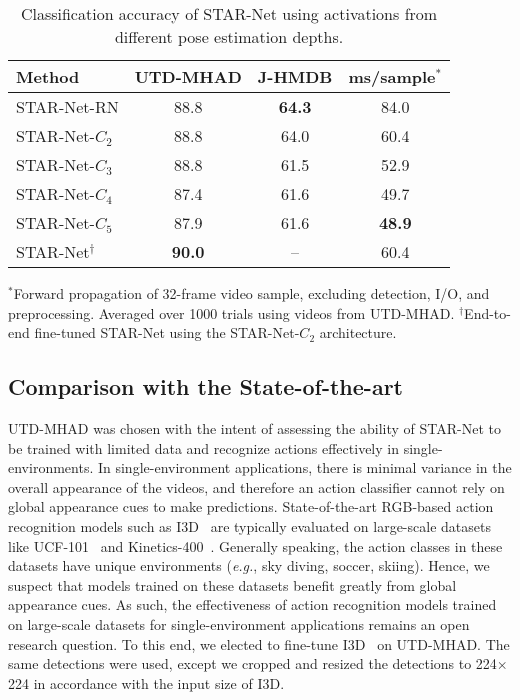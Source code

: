 \documentclass[10pt, conference, compsocconf]{IEEEtran}
\begin{document}
\begin{table}
\caption{Classification accuracy of STAR-Net using activations from different pose estimation depths.}
\vspace{-10pt}
\label{tab:starnet_results}
\begin{center}
\begin{tabular}{|l|c|c|c|}
\hline
Method & UTD-MHAD & J-HMDB & ms/sample$^*$\\
\hline\hline
STAR-Net-RN & 88.8 & \textbf{64.3} & 84.0\\
STAR-Net-$C_2$ & 88.8 & 64.0 & 60.4\\
STAR-Net-$C_3$ & 88.8 & 61.5 & 52.9\\
STAR-Net-$C_4$ & 87.4 & 61.6 & 49.7\\
STAR-Net-$C_5$ & 87.9 & 61.6 & \textbf{48.9}\\
\hline
STAR-Net$^\dagger$ & \textbf{90.0} & -- & 60.4\\
\hline
\end{tabular}
\end{center}
$^*$Forward propagation of 32-frame video sample, excluding detection, I/O, and preprocessing. Averaged over 1000 trials using videos from UTD-MHAD. 
$^\dagger$End-to-end fine-tuned STAR-Net using the STAR-Net-$C_2$ architecture.
\vspace{-15pt}
\end{table}

\subsection{Comparison with the State-of-the-art}

UTD-MHAD was chosen with the intent of assessing the ability of STAR-Net to be trained with limited data and recognize actions effectively in single-environments. In single-environment applications, there is minimal variance in the overall appearance of the videos, and therefore an action classifier cannot rely on global appearance cues to make predictions. State-of-the-art RGB-based action recognition models such as I3D~\cite{carreira2017quo} are typically evaluated on large-scale datasets like UCF-101~\cite{soomro2012ucf101} and Kinetics-400~\cite{kay2017kinetics}. Generally speaking, the action classes in these datasets have unique environments (\textit{e.g.}, sky diving, soccer, skiing). Hence, we suspect that models trained on these datasets benefit greatly from global appearance cues. As such, the effectiveness of action recognition models trained on large-scale datasets for single-environment applications remains an open research question. To this end, we elected to fine-tune I3D~\cite{carreira2017quo} on UTD-MHAD. The same detections were used, except we cropped and resized the detections to 224$\times$224 in accordance with the input size of I3D.
\end{document}
